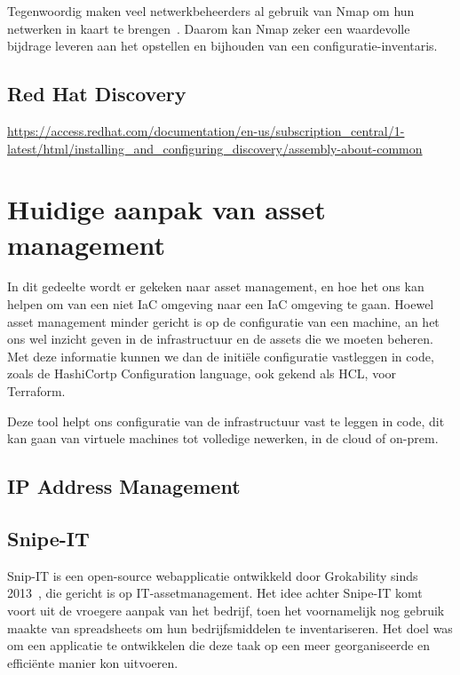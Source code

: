 Tegenwoordig maken veel netwerkbeheerders al gebruik van Nmap om hun netwerken in kaart te brengen~\autocite{nmap-website}.
Daarom kan Nmap zeker een waardevolle bijdrage leveren aan het opstellen en bijhouden van een configuratie-inventaris.

\subsection{Red Hat Discovery}
\label{sub:red-hat-discovery}

\url{https://access.redhat.com/documentation/en-us/subscription_central/1-latest/html/installing_and_configuring_discovery/assembly-about-common}

\section{Huidige aanpak van asset management}%
\label{sec:huidige-aanpak-van-asset-management}

In dit gedeelte wordt er gekeken naar asset management, en hoe het ons kan helpen om van een niet IaC omgeving naar een IaC omgeving te gaan.
Hoewel asset management minder gericht is op de configuratie van een machine, an het ons wel inzicht geven in de infrastructuur en de assets die we moeten beheren.
Met deze informatie kunnen we dan de initi\"ele configuratie vastleggen in code, zoals de HashiCortp Configuration language, ook gekend als HCL, voor Terraform.

Deze tool helpt ons configuratie van de infrastructuur vast te leggen in code, dit kan gaan van virtuele machines tot volledige newerken, in de cloud of on-prem.

\subsection{IP Address Management}
\label{sub:ipam}

\subsection{Snipe-IT}
\label{sub:snipe-it}

Snip-IT is een open-source webapplicatie ontwikkeld door Grokability sinds 2013~\autocite{snipe-it-introduction}, die gericht is op IT-assetmanagement.
Het idee achter Snipe-IT komt voort uit de vroegere aanpak van het bedrijf, toen het voornamelijk nog gebruik maakte van spreadsheets om hun bedrijfsmiddelen te inventariseren.
Het doel was om een applicatie te ontwikkelen die deze taak op een meer georganiseerde en effici\"ente manier kon uitvoeren.

